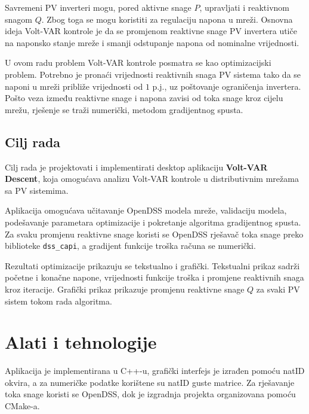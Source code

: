 \documentclass[12pt,oneside, a4paper]{book}
\begin{document}
Savremeni PV inverteri mogu, pored aktivne snage $P$, upravljati i reaktivnom snagom $Q$. Zbog toga se mogu koristiti za regulaciju napona u mreži. Osnovna ideja Volt-VAR kontrole je da se promjenom reaktivne snage PV invertera utiče na naponsko stanje mreže i smanji odstupanje napona od nominalne vrijednosti.

U ovom radu problem Volt-VAR kontrole posmatra se kao optimizacijski problem. Potrebno je pronaći vrijednosti reaktivnih snaga PV sistema tako da se naponi u mreži približe vrijednosti od $1$ p.j., uz poštovanje ograničenja invertera. Pošto veza između reaktivne snage i napona zavisi od toka snage kroz cijelu mrežu, rješenje se traži numerički, metodom gradijentnog spusta.

\section{Cilj rada}

Cilj rada je projektovati i implementirati desktop aplikaciju \textbf{Volt-VAR Descent}, koja omogućava analizu Volt-VAR kontrole u distributivnim mrežama sa PV sistemima.

Aplikacija omogućava učitavanje OpenDSS modela mreže, validaciju modela, podešavanje parametara optimizacije i pokretanje algoritma gradijentnog spusta. Za svaku promjenu reaktivne snage koristi se OpenDSS rješavač toka snage preko biblioteke \texttt{dss\_capi}, a gradijent funkcije troška računa se numerički.

Rezultati optimizacije prikazuju se tekstualno i grafički. Tekstualni prikaz sadrži početne i konačne napone, vrijednosti funkcije troška i promjene reaktivnih snaga kroz iteracije. Grafički prikaz prikazuje promjenu reaktivne snage $Q$ za svaki PV sistem tokom rada algoritma.

\chapter{Alati i tehnologije}

Aplikacija je implementirana u C++-u, grafički interfejs je izrađen pomoću natID okvira, a za numeričke podatke korištene su natID guste matrice. Za rješavanje toka snage koristi se OpenDSS, dok je izgradnja projekta organizovana pomoću CMake-a.
\end{document}
